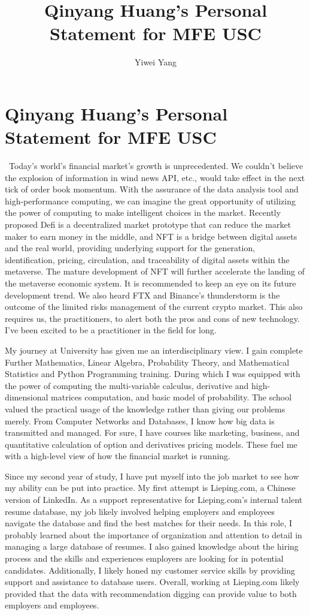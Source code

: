 \documentclass[a4paper,english]{article}
\title{Qinyang Huang's Personal Statement for MFE USC}
\author{Yiwei Yang}
\def\centersec#1{\centering#1} %
\begin{document}
\section*{\centersec{Qinyang Huang's Personal Statement for MFE USC}}
\quad\ Today's world's financial market's growth is unprecedented. We couldn't believe the explosion of information in wind news API, etc., would take effect in the next tick of order book momentum. With the assurance of the data analysis tool and high-performance computing, we can imagine the great opportunity of utilizing the power of computing to make intelligent choices in the market. Recently proposed Defi is a decentralized market prototype that can reduce the market maker to earn money in the middle, and NFT is a bridge between digital assets and the real world, providing underlying support for the generation, identification, pricing, circulation, and traceability of digital assets within the metaverse. The mature development of NFT will further accelerate the landing of the metaverse economic system. It is recommended to keep an eye on its future development trend. We also heard FTX and Binance's thunderstorm is the outcome of the limited risks management of the current crypto market. This also requires us, the practitioners, to alert both the pros and cons of new technology. I've been excited to be a practitioner in the field for long.

My journey at University has given me an interdisciplinary view. I gain complete Further Mathematics, Linear Algebra, Probability Theory, and Mathematical Statistics and Python Programming training. During which I was equipped with the power of computing the multi-variable calculus, derivative and high-dimensional matrices computation, and basic model of probability. The school valued the practical usage of the knowledge rather than giving our problems merely. From Computer Networks and Databases, I know how big data is transmitted and managed. For sure, I have courses like marketing, business, and quantitative calculation of option and derivatives pricing models. These fuel me with a high-level view of how the financial market is running.

Since my second year of study, I have put myself into the job market to see how my ability can be put into practice. My first attempt is Lieping.com, a Chinese version of LinkedIn. As a support representative for Lieping.com's internal talent resume database, my job likely involved helping employers and employees navigate the database and find the best matches for their needs. In this role, I probably learned about the importance of organization and attention to detail in managing a large database of resumes. I also gained knowledge about the hiring process and the skills and experiences employers are looking for in potential candidates. Additionally, I likely honed my customer service skills by providing support and assistance to database users. Overall, working at Lieping.com likely provided that the data with recommendation digging can provide value to both employers and employees. 
\end{document}
